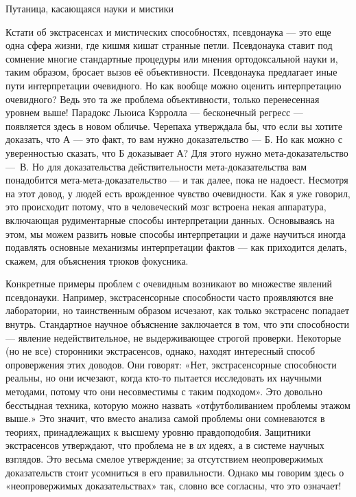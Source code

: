 \documentclass[../main.tex]{subfiles}
\begin{document}
Путаница, касающаяся науки и мистики

Кстати об экстрасенсах и мистических способностях, псевдонаука --- это еще одна сфера жизни, где кишмя кишат странные петли. Псевдонаука ставит под сомнение многие стандартные процедуры или мнения ортодоксальной науки и, таким образом, бросает вызов её объективности. Псевдонаука предлагает иные пути интерпретации очевидного. Но как вообще можно оценить интерпретацию очевидного? Ведь это та же проблема объективности, только перенесенная уровнем выше! Парадокс Льюиса Кэрролла --- бесконечный регресс --- появляется здесь в новом обличье. Черепаха утверждала бы, что если вы хотите доказать, что А --- это факт, то вам нужно доказательство --- Б. Но как можно с уверенностью сказать, что Б доказывает А? Для этого нужно мета-доказательство ---~В. Но для доказательства действительности мета-доказательства вам понадобится мета-мета-доказательство --- и так далее, пока не надоест. Несмотря на этот довод, у людей есть врожденное чувство очевидности. Как я уже говорил, это происходит потому, что в человеческий мозг встроена некая аппаратура, включающая рудиментарные способы интерпретации данных. Основываясь на этом, мы можем развить новые способы интерпретации и даже научиться иногда подавлять основные механизмы интерпретации фактов --- как приходится делать, скажем, для объяснения трюков фокусника.

Конкретные примеры проблем с очевидным возникают во множестве явлений псевдонауки. Например, экстрасенсорные способности часто проявляются вне лаборатории, но таинственным образом исчезают, как только экстрасенс попадает внутрь. Стандартное научное объяснение заключается в том, что эти способности --- явление недействительное, не выдерживающее строгой проверки. Некоторые (но не все) сторонники экстрасенсов, однако, находят интересный способ опровержения этих доводов. Они говорят: «Нет, экстрасенсорные способности реальны, но они исчезают, когда кто-то пытается исследовать их научными методами, потому что они несовместимы с таким подходом». Это довольно бесстыдная техника, которую можно назвать «отфутболиванием проблемы этажом выше.» Это значит, что вместо анализа самой проблемы они сомневаются в теориях, принадлежащих к высшему уровню правдоподобия. Защитники экстрасенсов утверждают, что проблема не в \emph{их} идеях, а в системе научных взглядов. Это весьма смелое утверждение; за отсутствием неопровержимых доказательств стоит усомниться в его правильности. Однако мы говорим здесь о «неопровержимых доказательствах» так, словно все согласны, что это означает!
\end{document}
